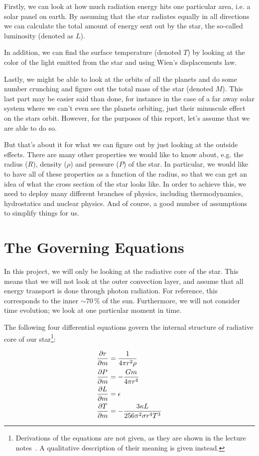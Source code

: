 \documentclass[11pt,twocolumn]{article}
\begin{document}
Firstly, we can look at how much radiation energy hits one particular
area, i.e. a solar panel on earth. By assuming that the star radiates
equally in all directions we can calculate the total amount of energy
sent out by the star, the so-called luminosity (denoted as $L$).

In addition, we can find the surface temperature (denoted $T$) by
looking at the color of the light emitted from the star and using
Wien's displacements law. 

Lastly, we might be able to look at the orbits of all the planets and
do some number crunching and figure out the total mass of the star
(denoted $M$). This last part may be easier said than done, for
instance in the case of a far away solar system where we can't even
see the planets orbiting, just their minuscule effect on the stars
orbit. However, for the purposes of this report, let's assume that we
are able to do so. 

But that's about it for what we can figure out by just looking at the
outside effects. There are many other properties we would like to know
about, e.g. the radius ($R$), density ($\rho$) and pressure ($P$) of
the star. In particular, we would like to have all of these properties
as a function of the radius, so that we can get an idea of what the
cross section of the star looks like. In order to achieve this, we
need to deploy many different branches of physics, including
thermodynamics, hydrostatics and nuclear physics. And of course, a good
number of assumptions to simplify things for us.


\section{The Governing Equations}
In this project, we will only be looking at the radiative core of the
star. This means that we will not look at the outer convection layer,
and assume that all energy transport is done through photon
radiation. For reference, this corresponds to the inner $\sim 70\,\%$ of the
sun. Furthermore, we will not consider time evolution; we look at one
particular moment in time. 

The following four differential equations govern the internal
structure of radiative core of our star\footnote{Derivations of the
  equations are not given, as they are shown in the lecture
  notes~\cite{lecture-notes}. A qualitative description of their
  meaning is given instead.}:

\begin{align}
  \frac{\partial r}{\partial m} &= \frac{ 1 }{ 4\pi r^2\rho }\label{eq:drdm}\\
  \frac{\partial P}{\partial m} &= - \frac{ Gm }{ 4\pi r^4 }\label{eq:dPdm}\\
  \frac{\partial L}{\partial m} &= \epsilon\label{eq:dLdm}\\
  \frac{\partial T}{\partial m} &= - \frac{ 3\kappa L }{ 256 \pi^2 \sigma r^4T^3 }\label{eq:dTdm}
\end{align}
\end{document}
